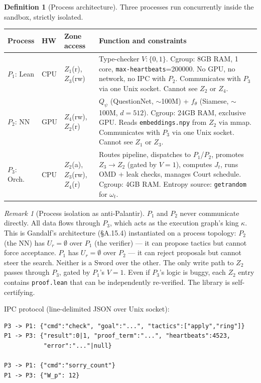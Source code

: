 \documentclass[11pt,a4paper]{article}
\theoremstyle{definition}
\newtheorem{definition}[theorem]{Definition}
\theoremstyle{remark}
\newtheorem{remark}[theorem]{Remark}
\begin{document}
\begin{definition}[Process architecture]\label{def:processes}
Three processes run concurrently inside the sandbox, strictly isolated.

\begin{center}
\small
\begin{tabularx}{\textwidth}{l l l X}
\toprule
\textbf{Process} & \textbf{HW} & \textbf{Zone access} & \textbf{Function and constraints} \\
\midrule
$P_1$: Lean & CPU & $Z_1$(r), $Z_3$(rw) & Type-checker $V: \{0,1\}$. Cgroup: 8GB RAM, 1 core, \texttt{max-heartbeats}=200000. No GPU, no network, no IPC with $P_2$. Communicates with $P_3$ via one Unix socket. Cannot see $Z_2$ or $Z_4$. \\
$P_2$: NN & GPU & $Z_4$(rw), $Z_2$(r) & $Q_\psi$ (QuestionNet, $\sim$100M) + $f_\theta$ (Siamese, $\sim$100M, $d{=}512$). Cgroup: 24GB RAM, exclusive GPU. Reads \texttt{embeddings.npy} from $Z_2$ via mmap. Communicates with $P_3$ via one Unix socket. Cannot see $Z_1$ or $Z_3$. \\
$P_3$: Orch. & CPU & $Z_2$(a), $Z_3$(rw), $Z_4$(r) & Routes pipeline, dispatches to $P_1$/$P_2$, promotes $Z_3 \to Z_2$ (gated by $V{=}1$), computes $J_t$, runs OMD + leak checks, manages Court schedule. Cgroup: 4GB RAM. Entropy source: \texttt{getrandom} for $\omega_t$. \\
\bottomrule
\end{tabularx}
\end{center}
\end{definition}

\begin{remark}[Process isolation as anti-Palantir]
$P_1$ and $P_2$ never communicate directly. All data flows through $P_3$, which acts as the execution graph's king $\kappa$. This is Gandalf's architecture (\S A.15.4) instantiated on a process topology: $P_2$ (the NN) has $U_r = \emptyset$ over $P_1$ (the verifier) --- it can propose tactics but cannot force acceptance. $P_1$ has $U_r = \emptyset$ over $P_2$ --- it can reject proposals but cannot steer the search. Neither is a Sword over the other. The only write path to $Z_2$ passes through $P_3$, gated by $P_1$'s $V = 1$. Even if $P_3$'s logic is buggy, each $Z_2$ entry contains \texttt{proof.lean} that can be independently re-verified. The library is self-certifying.
\end{remark}

IPC protocol (line-delimited JSON over Unix socket):
\begin{lstlisting}[caption={P3 $\leftrightarrow$ P1 protocol (Lean commands)}]
P3 -> P1: {"cmd":"check", "goal":"...", "tactics":["apply","ring"]}
P1 -> P3: {"result":0|1, "proof_term":"...", "heartbeats":4523,
           "error":"..."|null}

P3 -> P1: {"cmd":"sorry_count"}
P1 -> P3: {"W_p": 12}
\end{lstlisting}
\end{document}
